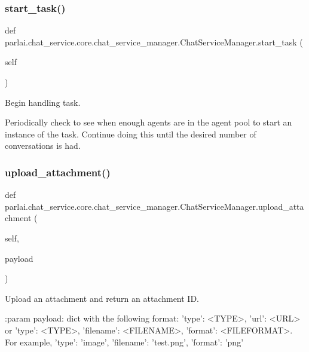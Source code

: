 \subsubsection{\texorpdfstring{start\+\_\+task()}{start\_task()}}
{\footnotesize\ttfamily def parlai.\+chat\+\_\+service.\+core.\+chat\+\_\+service\+\_\+manager.\+Chat\+Service\+Manager.\+start\+\_\+task (\begin{DoxyParamCaption}\item[{}]{self }\end{DoxyParamCaption})}

\begin{DoxyVerb}Begin handling task.

Periodically check to see when enough agents are in the agent pool to start an
instance of the task. Continue doing this until the desired number of
conversations is had.
\end{DoxyVerb}
 \mbox{\label{classparlai_1_1chat__service_1_1core_1_1chat__service__manager_1_1ChatServiceManager_a7e2ef8f0e63e1078cbffccbcaa6719b0}} 
\subsubsection{\texorpdfstring{upload\+\_\+attachment()}{upload\_attachment()}}
{\footnotesize\ttfamily def parlai.\+chat\+\_\+service.\+core.\+chat\+\_\+service\+\_\+manager.\+Chat\+Service\+Manager.\+upload\+\_\+attachment (\begin{DoxyParamCaption}\item[{}]{self,  }\item[{}]{payload }\end{DoxyParamCaption})}

\begin{DoxyVerb}Upload an attachment and return an attachment ID.

:param payload:
    dict with the following format:
{'type': <TYPE>, 'url': <URL>} or
{'type': <TYPE>, 'filename': <FILENAME>, 'format': <FILEFORMAT>}.
For example,
{'type': 'image', 'filename': 'test.png', 'format': 'png'}
\end{DoxyVerb}
 

